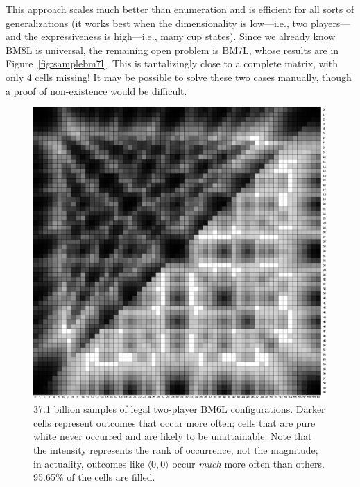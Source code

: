 \documentclass[twocolumn]{article}
\begin{document}
This approach scales much better than enumeration and is efficient for
all sorts of generalizations (it works best when the dimensionality is
low---i.e., two players---and the expressiveness is high---i.e., many
cup states). Since we already know BM8L is universal, the remaining
open problem is BM7L, whose results are in
Figure~\ref{fig:samplebm7l}. This is tantalizingly close to a complete
matrix, with only 4 cells missing! It may be possible to solve these
two cases manually, though a proof of non-existence would be
difficult.

\begin{figure}
\begin{center}
\includegraphics[width=0.90 \linewidth]{sample60min2players6states.png}
\end{center}\vspace{-0.1in}
\caption{ 37.1 billion samples of legal two-player BM6L
  configurations. Darker cells represent outcomes that occur more
  often; cells that are pure white never occurred and are likely to be
  unattainable. Note that the intensity represents the rank of
  occurrence, not the magnitude; in actuality, outcomes like $\langle
  0, 0 \rangle$ occur {\em much} more often than others.
  95.65\% of the cells are filled.
}
\label{fig:samplebm6l}
\end{figure}
\end{document}
